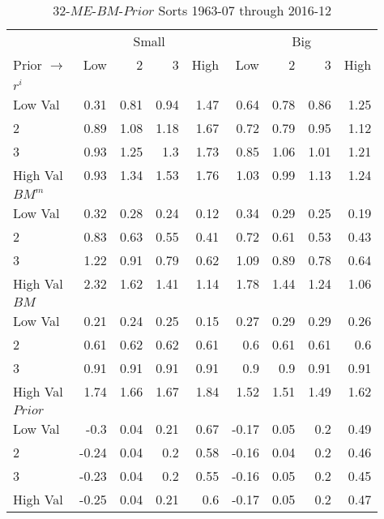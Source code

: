 
\begin{table}[!ht]
\centering
\caption{32-$ME$-$BM$-$Prior$ Sorts 1963-07 through 2016-12}
\begin{tabular}{lrrrrrrrr}
  \toprule
    & \multicolumn{4}{c}{Small} & \multicolumn{4}{c}{Big} \\
      \cmidrule(r){2-5} \cmidrule(r){6-9}
  Prior $\rightarrow$ & Low & 2 & 3 & High & Low & 2 & 3 & High \\ 
  \midrule
  

    \multicolumn{9}{l}{$r^i$} \\
    Low Val    & 0.31  & 0.81  & 0.94  & 1.47  & 0.64  & 0.78  & 0.86  & 1.25  \\
           2   & 0.89  & 1.08  & 1.18  & 1.67  & 0.72  & 0.79  & 0.95  & 1.12  \\
           3   & 0.93  & 1.25  & 1.3  & 1.73  & 0.85  & 1.06  & 1.01  & 1.21  \\
    High Val   & 0.93  & 1.34  & 1.53  & 1.76  & 1.03  & 0.99  & 1.13  & 1.24  \\
    [1em]
  

    \multicolumn{9}{l}{$BM^m$} \\
    Low Val    & 0.32  & 0.28  & 0.24  & 0.12  & 0.34  & 0.29  & 0.25  & 0.19  \\
           2   & 0.83  & 0.63  & 0.55  & 0.41  & 0.72  & 0.61  & 0.53  & 0.43  \\
           3   & 1.22  & 0.91  & 0.79  & 0.62  & 1.09  & 0.89  & 0.78  & 0.64  \\
    High Val   & 2.32  & 1.62  & 1.41  & 1.14  & 1.78  & 1.44  & 1.24  & 1.06  \\
    [1em]
  

    \multicolumn{9}{l}{$BM$} \\
    Low Val    & 0.21  & 0.24  & 0.25  & 0.15  & 0.27  & 0.29  & 0.29  & 0.26  \\
           2   & 0.61  & 0.62  & 0.62  & 0.61  & 0.6  & 0.61  & 0.61  & 0.6  \\
           3   & 0.91  & 0.91  & 0.91  & 0.91  & 0.9  & 0.9  & 0.91  & 0.91  \\
    High Val   & 1.74  & 1.66  & 1.67  & 1.84  & 1.52  & 1.51  & 1.49  & 1.62  \\
    [1em]
  

    \multicolumn{9}{l}{$Prior$} \\
    Low Val    & -0.3  & 0.04  & 0.21  & 0.67  & -0.17  & 0.05  & 0.2  & 0.49  \\
           2   & -0.24  & 0.04  & 0.2  & 0.58  & -0.16  & 0.04  & 0.2  & 0.46  \\
           3   & -0.23  & 0.04  & 0.2  & 0.55  & -0.16  & 0.05  & 0.2  & 0.45  \\
    High Val   & -0.25  & 0.04  & 0.21  & 0.6  & -0.17  & 0.05  & 0.2  & 0.47  \\
    [1em]
  


\end{tabular}
\end{table}
